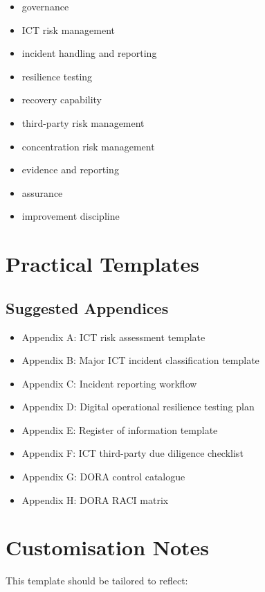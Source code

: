 \documentclass[
  letterpaper,
  DIV=11,
  numbers=noendperiod]{scrartcl}
\providecommand{\tightlist}{%
  \setlength{\itemsep}{0pt}\setlength{\parskip}{0pt}}
\begin{document}
\begin{itemize}
\tightlist
\item
  governance
\item
  ICT risk management
\item
  incident handling and reporting
\item
  resilience testing
\item
  recovery capability
\item
  third-party risk management
\item
  concentration risk management
\item
  evidence and reporting
\item
  assurance
\item
  improvement discipline
\end{itemize}

\section{Practical Templates}\label{practical-templates}

\subsection{Suggested Appendices}\label{suggested-appendices}

\begin{itemize}
\tightlist
\item
  Appendix A: ICT risk assessment template
\item
  Appendix B: Major ICT incident classification template
\item
  Appendix C: Incident reporting workflow
\item
  Appendix D: Digital operational resilience testing plan
\item
  Appendix E: Register of information template
\item
  Appendix F: ICT third-party due diligence checklist
\item
  Appendix G: DORA control catalogue
\item
  Appendix H: DORA RACI matrix
\end{itemize}

\section{Customisation Notes}\label{customisation-notes}

This template should be tailored to reflect:
\end{document}
